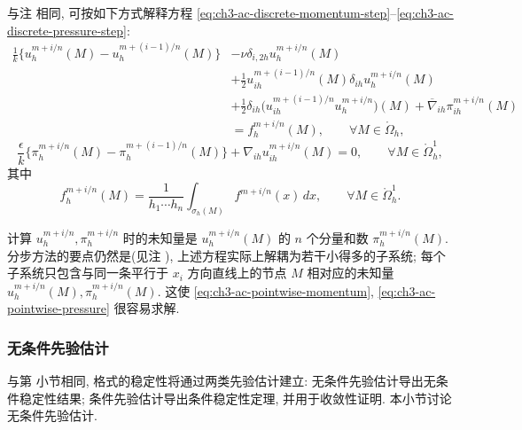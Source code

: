 \hypertarget{chapter-03-page-316}{}
\begin{Remark}
\label{rem:ch3-ac-pointwise-scheme}
与注  相同, 可按如下方式解释方程 \eqref{eq:ch3-ac-discrete-momentum-step}--\eqref{eq:ch3-ac-discrete-pressure-step}:
\begin{equation}
\begin{aligned}
\frac1k\{u_h^{m+i/n}(M)-u_h^{m+(i-1)/n}(M)\}
&-\nu\delta_{i,2h}u_h^{m+i/n}(M)\\
&+\frac12u_{ih}^{m+(i-1)/n}(M)\delta_{ih}u_h^{m+i/n}(M)\\
&+\frac12\delta_{ih}
\bigl(u_{ih}^{m+(i-1)/n}u_h^{m+i/n}\bigr)(M)
+\overline\nabla_{ih}\pi_{ih}^{m+i/n}(M)\\
&=f_h^{m+i/n}(M),
\qquad\forall M\in\mathring\Omega_h,
\end{aligned}
\label{eq:ch3-ac-pointwise-momentum}
\end{equation}
\begin{equation}
\frac\epsilon k\{\pi_h^{m+i/n}(M)-\pi_h^{m+(i-1)/n}(M)\}
+\nabla_{ih}u_{ih}^{m+i/n}(M)=0,
\qquad\forall M\in\mathring\Omega_h^1,
\label{eq:ch3-ac-pointwise-pressure}
\end{equation}
其中
\begin{equation}
f_h^{m+i/n}(M)=\frac1{h_1\cdots h_n}
\int_{\sigma_h(M)}f^{m+i/n}(x)\,dx,
\qquad\forall M\in\mathring\Omega_h^1.
\label{eq:ch3-ac-pointwise-force-average}
\end{equation}

计算 $u_h^{m+i/n},\pi_h^{m+i/n}$ 时的未知量是 $u_h^{m+i/n}(M)$ 的 $n$ 个分量和数 $\pi_h^{m+i/n}(M)$. 分步方法的要点仍然是(见注 ), 上述方程实际上解耦为若干小得多的子系统; 每个子系统只包含与同一条平行于 $x_i$ 方向直线上的节点 $M$ 相对应的未知量 $u_h^{m+i/n}(M),\pi_h^{m+i/n}(M)$. 这使 \eqref{eq:ch3-ac-pointwise-momentum}, \eqref{eq:ch3-ac-pointwise-pressure} 很容易求解.
\end{Remark}

\subsubsection{无条件先验估计}
\label{subsubsec:ch3-ac-unconditional-estimates}

与第  小节相同, 格式的稳定性将通过两类先验估计建立: 无条件先验估计导出无条件稳定性结果; 条件先验估计导出条件稳定性定理, 并用于收敛性证明. 本小节讨论无条件先验估计.

